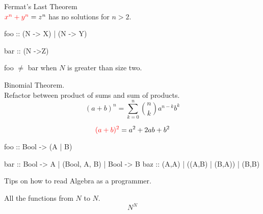 \documentclass{beamer}
\begin{document}
\begin{frame}[fragile]
Fermat's Last Theorem\\

$ \textcolor{red}{x^{n} + y^{n} }= z^{n} $ has no solutions for $n>2$.\newline
\color{red}
\begin{code}
foo :: (N -> X) | (N -> Y)
\end{code}
\color{black}
\begin{code}
bar :: (N ->Z)
\end{code}
foo $\neq$  bar when $N$ is greater than size two.
\end{frame}


\begin{frame}[fragile]
Binomial Theorem.  \\ Refactor between product of sums and sum of products.
$$(a+b)^{n} = \sum_{k=0}^{n}{n \choose k} a^{n-k}b^{k}$$

$$\textcolor{red}{(a+b)^{2}} = a^{2} + 2ab + b^{2}$$
\color{red}
\begin{code}
foo :: Bool -> (A | B)
\end{code}
\color{black}
\begin{code}
bar :: Bool -> A
      | (Bool, A, B)
      | Bool -> B 
baz :: (A,A) | ((A,B) | (B,A)) | (B,B)
     
\end{code}
\end{frame}




\begin{frame}[fragile]
Tips on how to read Algebra as a programmer.
\end{frame}

\begin{frame}[fragile]
All the functions from $N$ to $N$.
$${N^{N}}$$
\end{frame}
\end{document}
